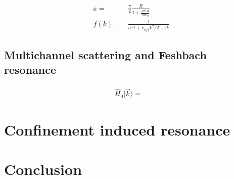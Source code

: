 \documentclass[aps,twocolumn,secnumarabic,balancelastpage,amsmath,amssymb,nofootinbib]{revtex4}
\newcommand{\ui}{\mathrm{i}}
\newcommand{\eqar}[1]
{
  \begin{align*}
    #1
  \end{align*}
}
\newcommand{\paren}[1]{{\left({#1}\right)}}
\begin{document}
\eqar{
  a=&\frac{\pi}{2}\frac{R}{1+\frac{2\pi^2R}{mU_0}}\\
  f\paren{k}=&\frac{1}{a^{-1}+r_{eff}k^2/2-\ui k}
}

\subsection{Multichannel scattering and Feshbach resonance}
\eqar{
  \hat H_0|\vec k\rangle=&
}



\section{Confinement induced resonance}





\section{Conclusion}


\end{document}
